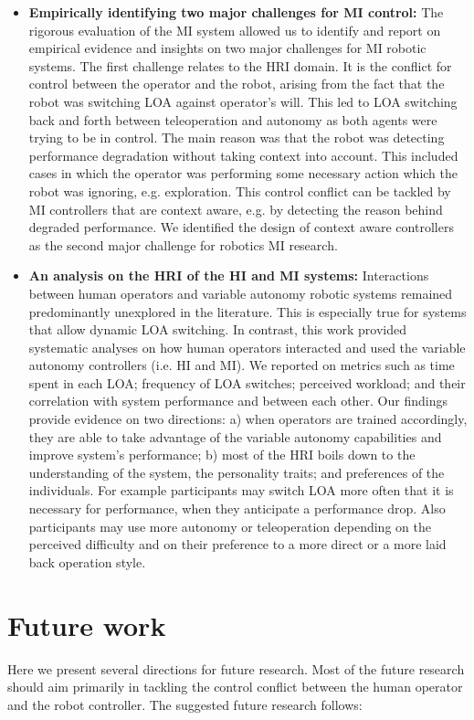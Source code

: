 \documentclass[a4paper,12pt,oneside,openright]{bhamthesis}
\begin{document}
\begin{itemize}
    \item \textbf{Empirically identifying two major challenges for MI control:} The rigorous evaluation of the MI system allowed us to identify and report on empirical evidence and insights on two major challenges for MI robotic systems. The first challenge relates to the HRI domain. It is the conflict for control between the operator and the robot, arising from the fact that the robot was switching LOA against operator's will. This led to LOA switching back and forth between teleoperation and autonomy as both agents were trying to be in control. The main reason was that the robot was detecting performance degradation without taking context into account. This included cases in which the operator was performing some necessary action which the robot was ignoring, e.g. exploration. This control conflict can be tackled by MI controllers that are context aware, e.g. by detecting the reason behind degraded performance. We identified the design of context aware controllers as the second major challenge for robotics MI research.
	
    \item \textbf{An analysis on the HRI of the HI and MI systems:} Interactions between human operators and variable autonomy robotic systems remained predominantly unexplored in the literature. This is especially true for systems that allow dynamic LOA switching. In contrast, this work provided systematic analyses on how human operators interacted and used the variable autonomy controllers (i.e. HI and MI). We reported on metrics such as time spent in each LOA; frequency of LOA switches; perceived workload; and their correlation with system performance and between each other. Our findings provide evidence on two directions: a) when operators are trained accordingly, they are able to take advantage of the variable autonomy capabilities and improve system's performance; b) most of the HRI boils down to the understanding of the system, the personality traits; and preferences of the individuals. For example participants may switch LOA more often that it is necessary for performance, when they anticipate a performance drop. Also participants may use more autonomy or teleoperation depending on the perceived difficulty and on their preference to a more direct or a more laid back operation style. 
     
\end{itemize}


\section{Future work}
Here we present several directions for future research. Most of the future research should aim primarily in tackling the control conflict between the human operator and the robot controller. The suggested future research follows:
\end{document}
